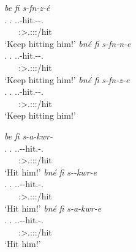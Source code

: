 \begin{exe}
\ex
\label{ex140}
\begin{xlist}
	\ex %
	\glll \emph{be} \emph{fi} \emph{s-fn-z-é}\\
	 \Ssg{}.{\Erg} \Third.{\Abs} \Tsg.\Masc.\Bet{}-hit.{\Ext}-{\Ndu}-\Ssg{}.{\Imp}\\
	 ~ ~ {\footnotesize \Ssg:\Sbj>\Tsg.\Masc:\Obj:\Imp:\Ipfv/hit}\\
	\trans `Keep hitting him!'
	\label{ex141}
	\ex %
	\glll \emph{bné} \emph{fi} \emph{s-fn-n-e}\\
	 \Snsg{}.{\Erg} \Third.{\Abs} \Tsg.\Masc.\Bet{}-hit.{\Ext}-{\Du}-\Snsg{}.{\Imp}\\
	  ~ ~ {\footnotesize \Sdu:\Sbj>\Tsg.\Masc:\Obj:\Imp:\Ipfv/hit}\\
	\trans `Keep hitting him!'
	\label{ex142}
	\ex %
	\glll \emph{bné} \emph{fi} \emph{s-fn-z-e}\\
	 \Snsg{}.{\Erg} \Third.{\Abs} \Tsg.\Masc.\Bet{}-hit.{\Ext}-{\Ndu}-\Snsg{}.{\Imp}\\
	  ~ ~ {\footnotesize \Spl:\Sbj>\Tsg.\Masc:\Obj:\Imp:\Ipfv/hit}\\
	\trans `Keep hitting him!'
	\label{ex143}
\end{xlist}
\end{exe}%
\begin{exe}
\ex
\label{ex144}
\begin{xlist}
	\ex %
	\glll \emph{be} \emph{fi} \emph{s-a-kwr-\Zero{}}\\
	\Ssg{}.{\Erg} \Third.{\Abs} \Tsg.\Masc.\Bet{}-{\Ndu}-hit.{\Rs}-\Ssg{}.{\Imp}\\
	~ ~ {\footnotesize \Ssg:\Sbj>\Tsg.\Masc:\Obj:\Imp:\Pfv/hit}\\
	\trans `Hit him!'
	\label{ex145}
	\ex %
	\glll \emph{bné} \emph{fi} \emph{s-\Zero{}-kwr-e}\\
	\Snsg{}.{\Erg} \Third.{\Abs} \Tsg.\Masc.\Bet{}-{\Du}-hit.{\Rs}-\Snsg{}.{\Imp}\\
	~ ~ {\footnotesize \Sdu:\Sbj>\Tsg.\Masc:\Obj:\Imp:\Pfv/hit}\\
	\trans `Hit him!'
	\label{ex146}
	\ex %
	\glll \emph{bné} \emph{fi} \emph{s-a-kwr-e}\\
	\Snsg{}.{\Erg} \Third.{\Abs} \Tsg.\Masc.\Bet{}-{\Ndu}-hit.{\Rs}-\Snsg{}.{\Imp}\\
	~ ~ {\footnotesize \Spl:\Sbj>\Tsg.\Masc:\Obj:\Imp:\Pfv/hit}\\
	\trans `Hit him!'
	\label{ex147}
\end{xlist}
\end{exe}%

